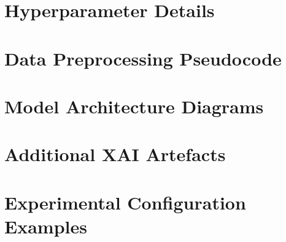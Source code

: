 \documentclass[11pt,a4paper]{article}
\begin{document}
\appendix

\section{Hyperparameter Details}
\label{app:hyperparams}


\section{Data Preprocessing Pseudocode}
\label{app:preprocessing}


\section{Model Architecture Diagrams}
\label{app:architectures}


\section{Additional XAI Artefacts}
\label{app:xai}


\section{Experimental Configuration Examples}
\label{app:configs}

\end{document}
